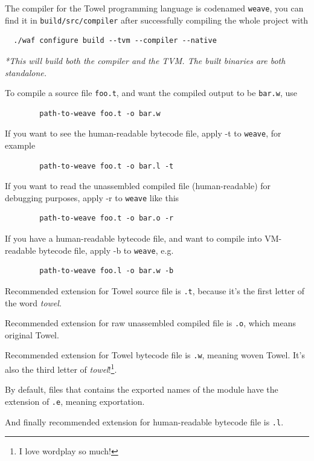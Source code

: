 \documentclass{report}
\begin{document}
The compiler for the Towel programming language is codenamed \texttt{weave}, you can find it in \texttt{build/src/compiler} after successfully compiling the whole project with
\begin{mdframed}[style=example]
\begin{verbatim}
  ./waf configure build --tvm --compiler --native
\end{verbatim}

\textit{*This will build both the compiler and the TVM. The built binaries are both standalone.}
\end{mdframed}

To compile a source file \texttt{foo.t}, and want the compiled output to be \texttt{bar.w}, use
\begin{verbatim}
        path-to-weave foo.t -o bar.w
\end{verbatim}

If you want to see the human-readable bytecode file, apply -t to \texttt{weave}, for example
\begin{verbatim}
        path-to-weave foo.t -o bar.l -t
\end{verbatim}

If you want to read the unassembled compiled file (human-readable) for debugging purposes, apply -r to \texttt{weave} like this
\begin{verbatim}
        path-to-weave foo.t -o bar.o -r
\end{verbatim}

If you have a human-readable bytecode file, and want to compile into VM-readable bytecode file, apply -b to \texttt{weave}, e.g.
\begin{verbatim}
        path-to-weave foo.l -o bar.w -b
\end{verbatim}

\begin{mdframed}[style=hint]
  Recommended extension for Towel source file is \texttt{.t}, because it's the first letter of the word \textit{towel}.

  Recommended extension for raw unassembled compiled file is \texttt{.o}, which means original Towel.

  Recommended extension for Towel bytecode file is \texttt{.w}, meaning woven Towel. It's also the third letter of \textit{towel}!\footnote{I love wordplay so much!}.

  By default, files that contains the exported names of the module have the extension of \texttt{.e}, meaning exportation.

  And finally recommended extension for human-readable bytecode file is \texttt{.l}.
\end{mdframed}
\end{document}
